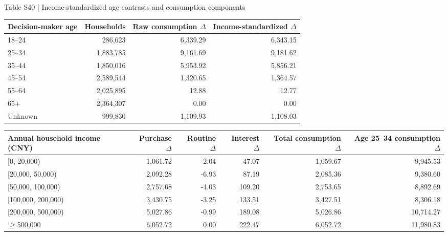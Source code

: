 \documentclass[10pt]{article}
\begin{document}
\begin{center}
\begin{minipage}{\textwidth}
\fontsize{8}{9.8}\selectfont
Table S40 | Income-standardized age contrasts and consumption components
\par\vspace{4pt}
\begin{tabularx}{\textwidth}{@{}Xrrr@{}}
\toprule
Decision-maker age & Households & Raw consumption $\Delta$ & Income-standardized $\Delta$ \\
\midrule
{18--24} & 286,623 & 6,339.29 & 6,343.15 \\
{25--34} & 1,883,785 & 9,161.69 & 9,181.62 \\
{35--44} & 1,850,016 & 5,953.92 & 5,856.21 \\
{45--54} & 2,589,544 & 1,320.65 & 1,364.57 \\
{55--64} & 2,025,895 & 12.88 & 12.77 \\
{65+} & 2,364,307 & 0.00 & 0.00 \\
{Unknown} & 999,830 & 1,109.93 & 1,108.03 \\

\bottomrule
\end{tabularx}
\par\vspace{8pt}
\begin{tabularx}{\textwidth}{@{}Xrrrrr@{}}
\toprule
Annual household income (CNY) & Purchase $\Delta$ & Routine $\Delta$ & Interest $\Delta$ & Total consumption $\Delta$ & Age 25--34 consumption $\Delta$ \\
\midrule
{[0, 20,000)} & 1,061.72 & -2.04 & 47.07 & 1,059.67 & 9,945.53 \\
{[20,000, 50,000)} & 2,092.28 & -6.93 & 87.19 & 2,085.36 & 9,380.60 \\
{[50,000, 100,000)} & 2,757.68 & -4.03 & 109.20 & 2,753.65 & 8,892.69 \\
{[100,000, 200,000)} & 3,430.75 & -3.25 & 133.51 & 3,427.51 & 8,306.18 \\
{[200,000, 500,000)} & 5,027.86 & -0.99 & 189.08 & 5,026.86 & 10,714.27 \\
{$\geq$500,000} & 6,052.72 & 0.00 & 222.47 & 6,052.72 & 11,980.83 \\

\bottomrule
\end{tabularx}
\par{}
\end{minipage}
\end{center}
\end{document}
